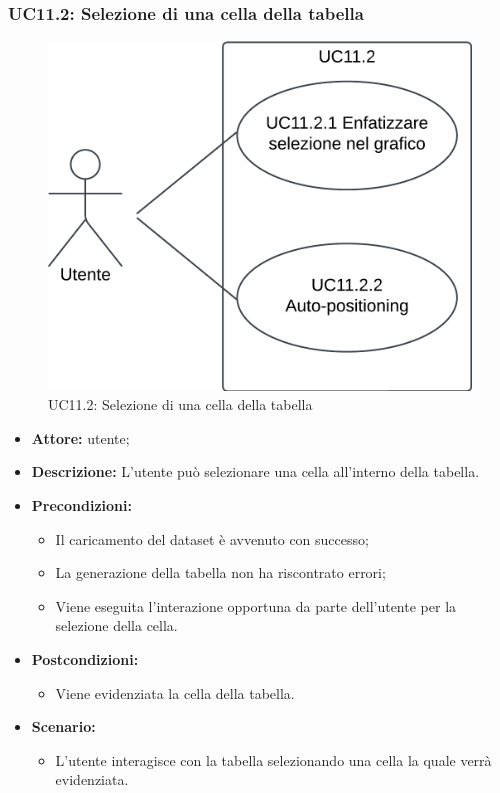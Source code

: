 \subsubsection{UC11.2: Selezione di una cella della tabella}
\begin{figure}[h!]\centering
    \includegraphics[scale=0.7]{template/images/UC11.2.png}
    \caption{UC11.2: Selezione di una cella della tabella}
\end{figure}
\begin{itemize}    
    \item \textbf{Attore:} utente;
    \item \textbf{Descrizione:} L'utente può selezionare una cella all'interno della tabella.
    \item \textbf{Precondizioni:}    
        \begin{itemize}
            \item Il caricamento del dataset è avvenuto con successo;
            \item La generazione della tabella non ha riscontrato errori;
            \item Viene eseguita l'interazione opportuna da parte dell'utente per la selezione della cella.
        \end{itemize}    
    \item \textbf{Postcondizioni:}
        \begin{itemize}
            \item Viene evidenziata la cella della tabella.
        \end{itemize}    
    \item \textbf{Scenario:} 
        \begin{itemize}
            \item L'utente interagisce con la tabella selezionando una cella la quale verrà evidenziata.
        \end{itemize}
\end{itemize}

